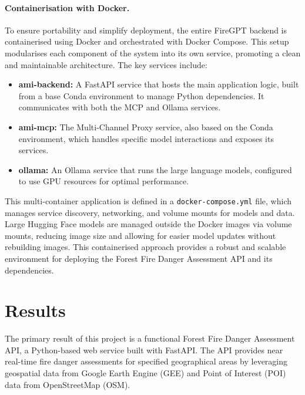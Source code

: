 \documentclass[lang=english,inputenc=utf8,fontsize=10pt]{ldvarticle}
\begin{document}
\paragraph{Containerisation with Docker.}
To ensure portability and simplify deployment, the entire FireGPT backend is containerised using Docker and orchestrated with Docker Compose. This setup modularises each component of the system into its own service, promoting a clean and maintainable architecture. The key services include:
\begin{itemize}
    \item \textbf{ami-backend:} A FastAPI service that hosts the main application logic, built from a base Conda environment to manage Python dependencies. It communicates with both the MCP and Ollama services.
    \item \textbf{ami-mcp:} The Multi-Channel Proxy service, also based on the Conda environment, which handles specific model interactions and exposes its services.
    \item \textbf{ollama:} An Ollama service that runs the large language models, configured to use GPU resources for optimal performance.
\end{itemize}
This multi-container application is defined in a \texttt{docker-compose.yml} file, which manages service discovery, networking, and volume mounts for models and data. Large Hugging Face models are managed outside the Docker images via volume mounts, reducing image size and allowing for easier model updates without rebuilding images. This containerised approach provides a robust and scalable environment for deploying the Forest Fire Danger Assessment API and its dependencies.


\newpage

\section{Results}
The primary result of this project is a functional Forest Fire Danger Assessment API, a Python-based web service built with FastAPI. The API provides near real-time fire danger assessments for specified geographical areas by leveraging geospatial data from Google Earth Engine (GEE) and Point of Interest (POI) data from OpenStreetMap (OSM).
\end{document}
